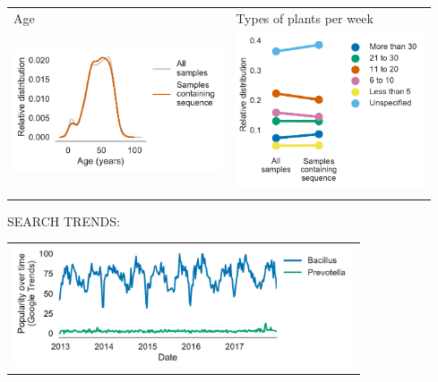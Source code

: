 \documentclass[9pt]{amsart}
\begin{document}
\begin{myboxA}
\begin{raggedright}
\begin{tabular}{C{6cm} C{6cm}}
Age & Types of plants per week\\
\includegraphics[height=3.6cm]{kde_age_years.pdf} & 
\includegraphics[height=4.6cm]{point_types_of_plants.pdf}\\ \\
\end{tabular}
\end{raggedright}

\vspace{-1cm}

SEARCH TRENDS:

\begin{raggedright}
\begin{tabular}{C{12cm}}
\includegraphics[height=3.6cm]{trends.pdf}
\end{tabular}
\end{raggedright}



\end{myboxA}
\end{document}
